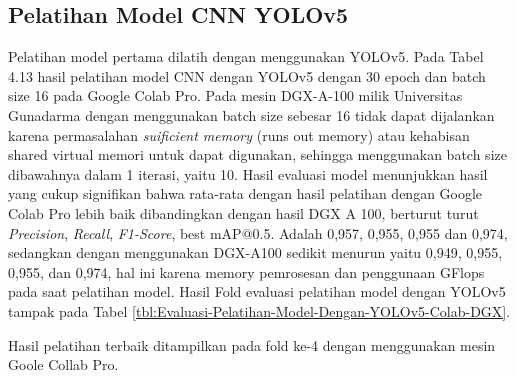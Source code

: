 \subsection{Pelatihan Model CNN YOLOv5}
\hspace{1,2cm}
Pelatihan model pertama dilatih dengan menggunakan YOLOv5. Pada Tabel 4.13 hasil pelatihan model CNN dengan YOLOv5 dengan 30 epoch dan batch size 16 pada Google Colab Pro. Pada mesin DGX-A-100 milik Universitas Gunadarma dengan menggunakan batch size sebesar 16 tidak dapat dijalankan karena permasalahan \textit{suificient memory} (runs out memory) atau kehabisan shared virtual memori untuk dapat digunakan, sehingga menggunakan batch size dibawahnya dalam 1 iterasi, yaitu 10. Hasil evaluasi model menunjukkan hasil yang cukup signifikan bahwa rata-rata dengan hasil pelatihan dengan Google Colab Pro lebih baik dibandingkan dengan hasil DGX A 100, berturut turut \textit{Precision}, \textit{Recall}, \textit{F1-Score}, best mAP@0.5. Adalah 0,957, 0,955, 0,955 dan 0,974, sedangkan dengan menggunakan DGX-A100 sedikit menurun yaitu 0,949, 0,955, 0,955, dan 0,974, hal ini karena memory pemrosesan dan penggunaan GFlops pada saat pelatihan model. Hasil Fold evaluasi pelatihan model dengan YOLOv5 tampak pada Tabel \ref{tbl:Evaluasi-Pelatihan-Model-Dengan-YOLOv5-Colab-DGX}.

Hasil pelatihan terbaik ditampilkan pada fold ke-4 dengan menggunakan mesin Goole Collab Pro.

